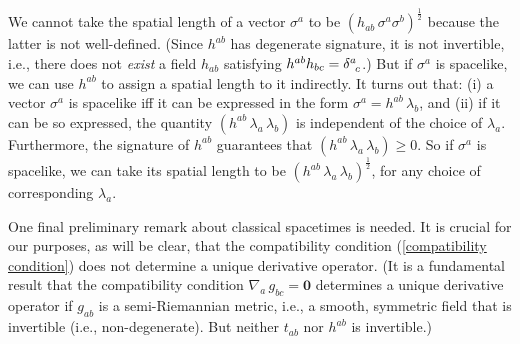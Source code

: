 \documentclass [12] {article}
\theoremstyle{plain}
\numberwithin{figure}{subsection}
\numberwithin{proposition}{subsection}
\begin{document}
We cannot take the  spatial length of a vector $\sigma^a$ to be $(h_{ab} \, \sigma^a  \sigma^b )^{\frac{1}{2}}$ because the latter is not well-defined. (Since $h^{ab}$ has degenerate signature, it is not invertible, i.e., there does not \emph{exist} a field $h_{ab}$ satisfying  $h^{ab} h_{bc} = \delta^{a}_{\hspace{.4em}c}$.) But if $\sigma^a$ is spacelike, we can use $h^{ab}$ to  assign a spatial length to it indirectly.  It turns out that:  (i) a vector $\sigma^a$ is spacelike iff it can be expressed in the form $\sigma^a = h^{ab} \, \lambda_b$, and (ii) if it can be so expressed, the quantity
$(h^{ab} \, \lambda_a \, \lambda_b)$  is independent of the choice of $\lambda_a$. %
Furthermore, the signature of $h^{ab}$ guarantees that  $(h^{ab} \, \lambda_a \, \lambda_b) \geq 0$.  So if $\sigma^a$ is spacelike, we can take its spatial length to be $(h^{ab} \, \lambda_a \, \lambda_b )^{\frac{1}{2}}$, for any choice of corresponding  $\lambda_a$.     


  

One final preliminary remark about classical spacetimes is needed. It is crucial for our purposes, as will be clear,  that the compatibility condition (\ref{compatibility condition}) does not determine a unique derivative operator. (It is a fundamental result that the compatibility condition $\nabla_a \, g_{bc} = \mathbf{0}$ determines a unique derivative operator if $g_{ab}$ is a semi-Riemannian metric, i.e., a smooth, symmetric field that is invertible (i.e., non-degenerate). But neither  $t_{ab}$ nor $h^{ab}$ is invertible.)
\end{document}
